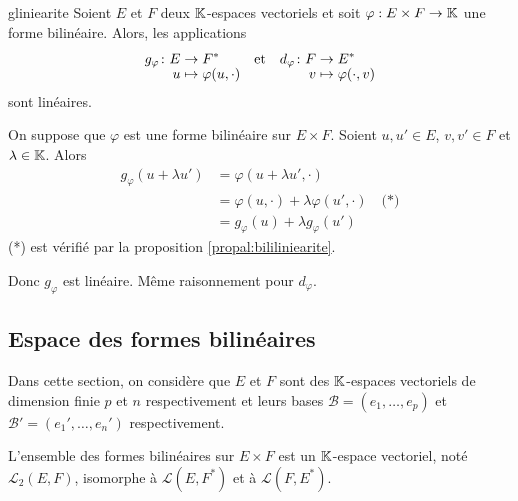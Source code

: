 \documentclass[a4paper,12pt]{article}
\begin{document}
\begin{proposition}{}{gliniearite}
    Soient $E$ et $F$ deux $\mathbb{K}$-espaces vectoriels et soit $\varphi: E \times F \to \mathbb{K}$ une forme bilinéaire. Alors, les applications
    $$
    \funcdef{g_\varphi}{E}{F^*}{u}{\varphi(u, \cdot)} \quad \text{et} \quad \funcdef{d_\varphi}{F}{E^*}{v}{\varphi(\cdot, v)}
    $$
    sont linéaires.
\end{proposition}

\begin{demonstration}
    On suppose que $\varphi$ est une forme bilinéaire sur $E \times F$. Soient $u, u' \in E$, $v, v' \in F$ et $\lambda \in \mathbb{K}$. Alors
    \begin{align*}
        g_\varphi(u + \lambda u') &= \varphi(u + \lambda u', \cdot) \\
        &= \varphi(u, \cdot) + \lambda \varphi(u', \cdot) \quad \text{(*)} \\
        &= g_\varphi(u) + \lambda g_\varphi(u')
    \end{align*}
    (*) est vérifié par la proposition \ref{propal:bililiniearite}.

    Donc $g_\varphi$ est linéaire. Même raisonnement pour $d_\varphi$.
\end{demonstration}

\subsection{Espace des formes bilinéaires}

Dans cette section, on considère que $E$ et $F$ sont des $\mathbb{K}$-espaces vectoriels de dimension finie $p$ et $n$ respectivement et leurs bases $\mathscr{B} = (e_1, \dots, e_p)$ et $\mathscr{B'} = (e_1', \dots, e_n')$ respectivement.
\vspace{1cm}

\begin{proposition}{}{}
    L'ensemble des formes bilinéaires sur $E \times F$ est un $\mathbb{K}$-espace vectoriel, noté $\mathcal{L}_2(E, F)$,
    isomorphe à $\mathcal{L}(E, F^*)$ et à $\mathcal{L}(F, E^*)$.
\end{proposition}
\end{document}
